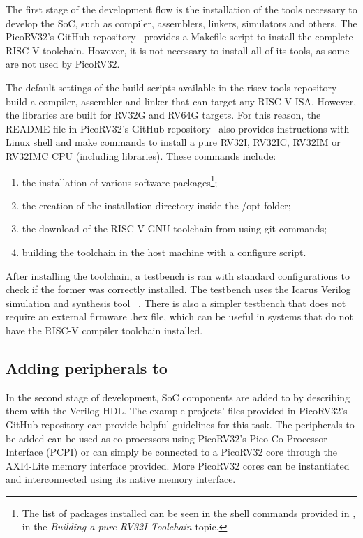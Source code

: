 The first stage of the development flow is the installation of the tools necessary to develop the SoC, such as compiler, assemblers, linkers, simulators and others. The PicoRV32's GitHub repository~\cite{bib:picorv32} provides a Makefile script to install the complete RISC-V toolchain. However, it is not necessary to install all of its tools, as some are not used by PicoRV32. 

The default settings of the build scripts available in the riscv-tools repository~\cite{bib:riscvtools} build a compiler, assembler and linker that can target any RISC-V ISA. However, the libraries are built for RV32G and RV64G targets. For this reason, the README file in PicoRV32's GitHub repository~\cite{bib:picorv32} also provides instructions with Linux shell and make commands to install a pure RV32I, RV32IC, RV32IM or RV32IMC CPU (including libraries). These commands include:

\begin{enumerate}
	\item the installation of various software packages\footnote{The list of packages installed can be seen in the shell commands provided in \cite{bib:picorv32}, in the \textit{Building a pure RV32I Toolchain} topic.};
	\item the creation of the installation directory inside the /opt folder;
	\item the download of the RISC-V GNU toolchain from \cite{bib:riscvgnutools} using git commands;
	\item building the toolchain in the host machine with a configure script.
\end{enumerate}

After installing the toolchain, a testbench is ran with standard configurations to check if the former was correctly installed. The testbench uses the Icarus Verilog simulation and synthesis tool ~\cite{bib:icarus}. There is also a simpler testbench that does not require an external firmware .hex file, which can be useful in systems that do not have the RISC-V compiler toolchain installed.

\subsection{Adding peripherals to \socname}
In the second stage of development, SoC components are added to \socname by describing them with the Verilog HDL. The example projects' files provided in PicoRV32's GitHub repository \cite{bib:picorv32} can provide helpful guidelines for this task. The peripherals to be added can be used as co-processors using PicoRV32's Pico Co-Processor Interface (PCPI) or can simply be connected to a PicoRV32 core through the AXI4-Lite memory interface provided. More PicoRV32 cores can be instantiated and interconnected using its native memory interface.

